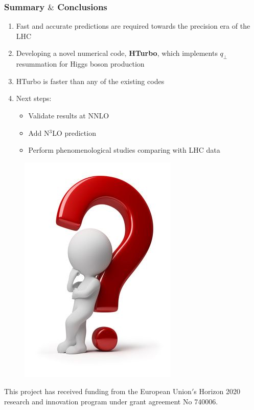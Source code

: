 \documentclass[aspectratio=43]{beamer}
\begin{document}
\begin{frame}
	
	\frametitle{Summary $\&$ Conclusions}

	\vspace{2.0 cm}
	
	\begin{enumerate}
		\item Fast and accurate predictions are required towards the precision era of the LHC
		\item Developing a novel numerical code, \textbf{HTurbo}, which implements $q_{\perp}$ resummation for Higgs boson production
		\item HTurbo is {\color{blue} faster than any of the existing codes}
		\item Next steps: 
		\begin{itemize}
			\item Validate results at NNLO
			\item Add {\color{blue}N$^{3}$LO} prediction
			\item Perform phenomenological studies comparing with LHC data
		\end{itemize}

	\end{enumerate}

	\vspace{2.0 cm}

\end{frame}

\begin{frame}


	\begin{figure}
		\includegraphics[width = 4 cm]{plots/thinking.png}
	\end{figure}		

	{\small \color{blue} This project has received funding from the European Union$'$s Horizon 2020 research and innovation program under grant agreement No 740006.}

\end{frame}
\end{document}

